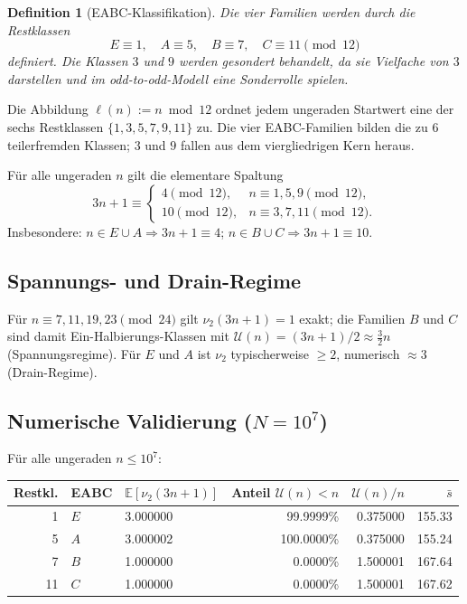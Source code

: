 \documentclass[12pt,a4paper]{article}
\newtheorem{definition}[satz]{Definition}
\newcommand{\vii}{\nu_2}
\newcommand{\U}{\mathcal{U}}
\begin{document}
\begin{definition}[EABC-Klassifikation]
Die vier Familien werden durch die Restklassen
\[
E\equiv1,\quad
A\equiv5,\quad
B\equiv7,\quad
C\equiv11
\pmod{12}
\]
definiert.
Die Klassen $3$ und $9$ werden gesondert behandelt,
da sie Vielfache von $3$ darstellen und im odd-to-odd-Modell
eine Sonderrolle spielen.
\end{definition}

Die Abbildung $\ell(n) := n \bmod 12$ ordnet jedem ungeraden Startwert
eine der sechs Restklassen $\{1,3,5,7,9,11\}$ zu. Die vier EABC-Familien
bilden die zu $6$ teilerfremden Klassen; $3$ und $9$ fallen aus dem
viergliedrigen Kern heraus.

\begin{tcolorbox}[bewiesen]
Für alle ungeraden $n$ gilt die elementare Spaltung
\[
  3n+1 \equiv
  \begin{cases}
    4 \pmod{12}, & n \equiv 1,5,9 \pmod{12},\\
    10 \pmod{12}, & n \equiv 3,7,11 \pmod{12}.
  \end{cases}
\]
Insbesondere: $n \in E \cup A \Rightarrow 3n+1 \equiv 4$;
$n \in B \cup C \Rightarrow 3n+1 \equiv 10$.
\end{tcolorbox}

\subsection{Spannungs- und Drain-Regime}

Für $n \equiv 7,11,19,23 \pmod{24}$ gilt $\vii(3n+1)=1$ exakt;
die Familien $B$ und $C$ sind damit Ein-Halbierungs-Klassen mit
$\U(n) = (3n+1)/2 \approx \tfrac{3}{2}n$ (Spannungsregime).
Für $E$ und $A$ ist $\vii$ typischerweise $\geq 2$, numerisch
$\approx 3$ (Drain-Regime).

\subsection{Numerische Validierung ($N = 10^7$)}

Für alle ungeraden $n \leq 10^7$:

\begin{center}
\renewcommand{\arraystretch}{1.3}
\begin{tabular}{rllrrr}
\toprule
Restkl. & EABC & $\mathbb{E}[\vii(3n+1)]$ & Anteil $\U(n)<n$ & $\U(n)/n$ & $\bar s$ \\
\midrule
1 & $E$ & 3.000000 & 99.9999\% & 0.375000 & 155.33 \\
5 & $A$ & 3.000002 & 100.0000\% & 0.375000 & 155.24 \\
7 & $B$ & 1.000000 & 0.0000\% & 1.500001 & 167.64 \\
11 & $C$ & 1.000000 & 0.0000\% & 1.500001 & 167.62 \\
\bottomrule
\end{tabular}
\end{center}
\end{document}
